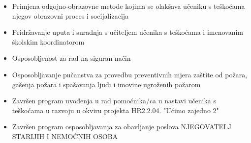\documentclass[10pt,a4paper,ragged2e,withhyper]{altacv}
\begin{document}
\begin{paracol}{2}
            \begin{itemize}
                \item Primjena odgojno-obrazovne metode kojima se olakšava učeniku s teškoćama njegov obrazovni proces i socijalizacija
                \item Pridržavanje uputa i suradnja s učiteljem učenika s teškoćama i imenovanim školskim koordinatorom
            \end{itemize}
        
        \newpage
            \begin{itemize}
                \item Osposobljenost za rad na siguran način
                \item Osposobljavanje pučanstva za provedbu preventivnih mjera zaštite od požara, gašenja požara i spašavanja ljudi i imovine ugroženih požarom
            \end{itemize}
            \divider
            
            
            \begin{itemize}
                \item Završen program uvođenja u rad pomoćnika/ca u nastavi učenika s teškoćama u razvoju u okviru projekta HR2.2.04. "Učimo zajedno 2"
            \end{itemize}
            \divider
            
            \begin{itemize}
                \item Završen program osposobljavanja za obavljanje poslova NJEGOVATELJ STARIJIH I NEMOĆNIH OSOBA
            \end{itemize}
            \divider
            
            \begin{itemize}
              
            \end{itemize}
            \divider
            
            
        
        
    \end{paracol}
\end{document}
